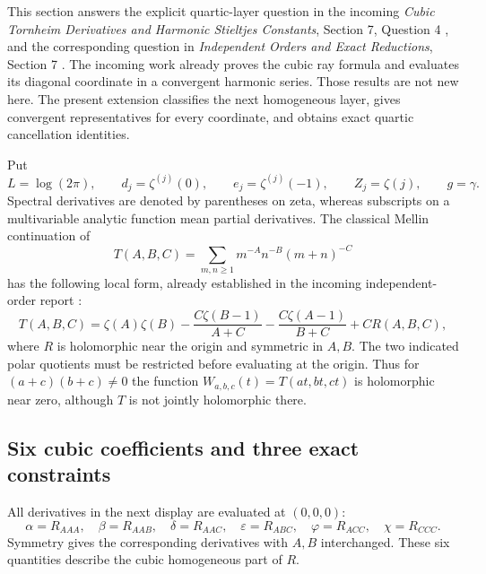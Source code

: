 \documentclass[11pt]{article}
\numberwithin{equation}{section}
\theoremstyle{definition}
\theoremstyle{remark}
\begin{document}
This section answers the explicit quartic-layer question in the incoming
\emph{Cubic Tornheim Derivatives and Harmonic Stieltjes Constants},
Section 7, Question 4 \cite{RepoCubic}, and the corresponding question in
\emph{Independent Orders and Exact Reductions}, Section 7 \cite{RepoIndependent}.
The incoming work already proves the cubic ray formula and evaluates its
diagonal coordinate in a convergent harmonic series. Those results are
not new here. The present extension classifies the next homogeneous layer,
gives convergent representatives for every coordinate, and obtains exact
quartic cancellation identities.

Put
\[
 L=\log(2\pi),\qquad d_j=\zeta^{(j)}(0),\qquad
 e_j=\zeta^{(j)}(-1),\qquad Z_j=\zeta(j),\qquad g=\gamma.
\]
Spectral derivatives are denoted by parentheses on zeta, whereas
subscripts on a multivariable analytic function mean partial derivatives.
The classical Mellin continuation \cite{BorweinDilcher} of
\[
 T(A,B,C)=\sum_{m,n\geq1}m^{-A}n^{-B}(m+n)^{-C}
\]
has the following local form, already established in the incoming
independent-order report \cite{RepoIndependent}:
\begin{equation}\label{qt:polar}
 T(A,B,C)=\zeta(A)\zeta(B)
 -\frac{C\zeta(B-1)}{A+C}
 -\frac{C\zeta(A-1)}{B+C}+C R(A,B,C),
\end{equation}
where $R$ is holomorphic near the origin and symmetric in $A,B$.
The two indicated polar quotients must be restricted before evaluating
at the origin. Thus for $(a+c)(b+c)\ne0$ the function
$W_{a,b,c}(t)=T(at,bt,ct)$ is holomorphic near zero, although $T$ is not
jointly holomorphic there.

\subsection{Six cubic coefficients and three exact constraints}

All derivatives in the next display are evaluated at $(0,0,0)$:
\[
 \alpha=R_{AAA},\quad \beta=R_{AAB},\quad
 \delta=R_{AAC},\quad \varepsilon=R_{ABC},\quad
 \varphi=R_{ACC},\quad \chi=R_{CCC}.
\]
Symmetry gives the corresponding derivatives with $A,B$ interchanged.
These six quantities describe the cubic homogeneous part of $R$.
\end{document}
